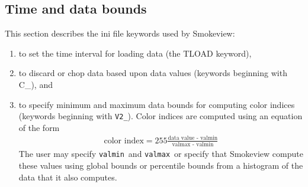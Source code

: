 \documentclass[11pt,twoside]{book}
\begin{document}
{%

\subsection{Time and data bounds}



\label{section:timedatabounds}
This section describes the ini file keywords used by Smokeview:
\begin{enumerate}
\item to set the time interval for loading data (the TLOAD keyword),

\item to discard or chop data based upon data values (keywords beginning with C\_), and

\item to specify minimum and maximum data bounds
for computing color indices (keywords beginning with {\tt V2\_}).
Color indices are computed using an equation of the form
\begin{eqnarray*}
\mbox{color index} = 255\frac{\mbox{data~value - valmin}}{\mbox{valmax - valmin}}
\end{eqnarray*}
The user may specify {\tt valmin}\  and {\tt valmax}\  or specify
that Smokeview compute these values using global bounds
or percentile bounds from a histogram of the data that it also computes.


\end{enumerate}}
\end{document}
